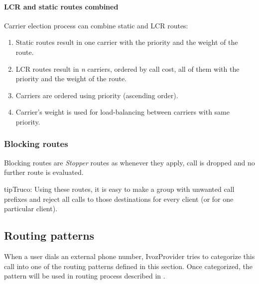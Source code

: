 \documentclass[letterpaper,10pt,spanish]{sphinxmanual}
\begin{document}
\paragraph{LCR and static routes combined}
\label{administration_portal/brand/routing/outgoing_routings:lcr-and-static-routes-combined}
Carrier election process can combine static and LCR routes:
\begin{enumerate}
\item {} 
Static routes result in one carrier with the priority and the weight of the route.

\item {} 
LCR routes result in \emph{n} carriers, ordered by call cost, all of them with the priority and the weight of the route.

\item {} 
Carriers are ordered using priority (ascending order).

\item {} 
Carrier's weight is used for load-balancing between carriers with same priority.

\end{enumerate}


\subsubsection{Blocking routes}
\label{administration_portal/brand/routing/outgoing_routings:blocking-routes}
Blocking routes are \emph{Stopper} routes as whenever they apply, call is dropped and no further route is evaluated.

\begin{notice}{tip}{Truco:}
Using these routes, it is easy to make a group with unwanted call prefixes and reject all calls to those
destinations for every client (or for one particular client).
\end{notice}


\subsection{Routing patterns}
\label{administration_portal/brand/routing/routing_patterns::doc}\label{administration_portal/brand/routing/routing_patterns:routing-patterns}\label{administration_portal/brand/routing/routing_patterns:id1}
When a user dials an external phone number, IvozProvider tries to categorize
this call into one of the routing patterns defined in this section. Once categorized,
the pattern will be used in routing process described in {\hyperref[administration_portal/brand/routing/outgoing_routings:outgoing\string-routings]{}}.
\end{document}
